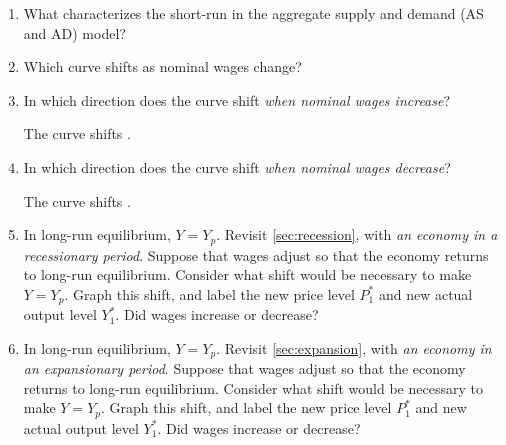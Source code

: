 \documentclass[
    letterpaper,paper=portrait,fleqn,
    DIV=16,fontsize=12pt,twoside=semi,
    parskip=full-,
    headings=standardclasses]
{scrartcl}
\begin{document}
\begin{enumerate}

\item What characterizes the short-run in the aggregate supply and demand (AS and AD) model?

\vfill

\item Which curve shifts as nominal wages change?

\vfill

\item In which direction does the curve shift \emph{when nominal wages increase}?

\vspace{1.0\baselineskip}
The \underline{\hspace{2in}} curve shifts \underline{\hspace{2in}}.
\vspace{1.0\baselineskip}

\item In which direction does the curve shift \emph{when nominal wages decrease}?

\vspace{1.0\baselineskip}
The \underline{\hspace{2in}} curve shifts \underline{\hspace{2in}}.
\vspace{1.0\baselineskip}

\item In long-run equilibrium, $Y=Y_p$. Revisit \cref{sec:recession}, with \emph{an economy in a recessionary period}. Suppose that wages adjust so that the economy returns to long-run equilibrium. Consider what shift would be necessary to make $Y=Y_p$. Graph this shift, and label the new price level $P^*_1$ and new actual output level $Y^*_1$. Did wages increase or decrease?

\vfill

\item In long-run equilibrium, $Y=Y_p$. Revisit \cref{sec:expansion}, with \emph{an economy in an expansionary period}. Suppose that wages adjust so that the economy returns to long-run equilibrium. Consider what shift would be necessary to make $Y=Y_p$. Graph this shift, and label the new price level $P^*_1$ and new actual output level $Y^*_1$. Did wages increase or decrease?

\vfill

\vspace{-2\baselineskip}
\clearpage

\end{enumerate}
\end{document}
